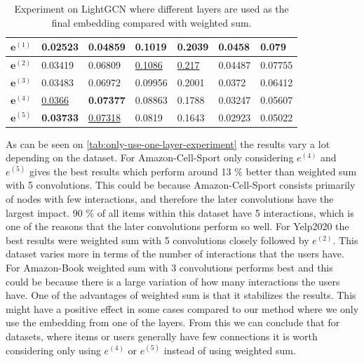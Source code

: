 \begin{table}[]
\begin{tabular}{|l|l|l|l|l|l|l|}
        $\mathbf{e}^{(1)}$   & 0.02523                                & 0.04859                       & 0.1019                           & 0.2039            & 0.0458              & 0.079               \\ \hline
        $\mathbf{e}^{(2)}$   & 0.03419                                & 0.06809                       & \underline{0.1086}               & \underline{0.217} & 0.04487             & 0.07755             \\ \hline
        $\mathbf{e}^{(3)}$   & 0.03483                                & 0.06972                       & 0.09956                          & 0.2001            & 0.0372              & 0.06412             \\ \hline
        $\mathbf{e}^{(4)}$   & \underline{0.0366}                     & \textbf{0.07377}              & 0.08863                          & 0.1788            & 0.03247             & 0.05607             \\ \hline
        $\mathbf{e}^{(5)}$   & \textbf{0.03733}                       & \underline{0.07318}           & 0.0819                           & 0.1643            & 0.02923             & 0.05022             \\ \hline
    \end{tabular}
    \centering
    \caption{Experiment on LightGCN where different layers are used as the final embedding compared with weighted sum.}
    \label{tab:only-use-one-layer-experiment}
\end{table}
As can be seen on \autoref{tab:only-use-one-layer-experiment} the results vary a lot depending on the dataset.
For Amazon-Cell-Sport only considering $e^{(4)}$ and $e^{(5)}$ gives the best results which perform around 13 \% better than weighted sum with 5 convolutions.
This could be because Amazon-Cell-Sport consists primarily of nodes with few interactions, and therefore the later convolutions have the largest impact. 
90 \% of all items within this dataset have 5 interactions, which is one of the reasons that the later convolutions perform so well.
For Yelp2020 the best results were weighted sum with 5 convolutions closely followed by $e^{(2)}$.
This dataset varies more in terms of the number of interactions that the users have.
For Amazon-Book weighted sum with 3 convolutions performs best and this could be because there is a large variation of how many interactions the users have.
One of the advantages of weighted sum is that it stabilizes the results.
This might have a positive effect in some cases compared to our method where we only use the embedding from one of the layers.
From this we can conclude that for datasets, where items or users generally have few connections it is worth considering only using $e^{(4)}$ or $e^{(5)}$ instead of using weighted sum.

